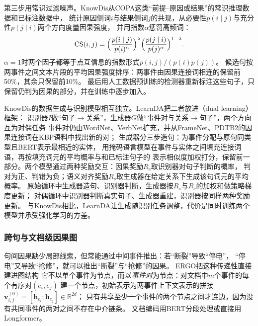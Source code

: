 第三步用常识过滤噪声。KnowDis从COPA这类“前提--原因或结果”的常识推理数据和已标注数据中，
统计原因侧词$i$与结果侧词$j$的共现，从必要性$p(i\mid j)$与充分性$p(j\mid i)$两个方向度量因果强度，
并用指数$\alpha$惩罚高频词：
\begin{equation}
  \mathrm{CS}(i,j)=\Bigl(\frac{p(i\mid j)}{p(i)^{\alpha}}\Bigr)^{\lambda}
                   \Bigl(\frac{p(j\mid i)}{p(j)^{\alpha}}\Bigr)^{1-\lambda}.
  \label{eq:nlp-extraction-knowdis-cs}
\end{equation}
$\alpha=1$时两个因子都等于点互信息的指数形式$p(i,j)/(p(i)p(j))$。
候选句按两事件之间文本片段的平均因果强度排序：两事件由因果连接词相连的保留前50\%，其余只保留前10\%。
最后用人工数据预训练的检测器重新标注这些句子，只保留仍判为因果的部分，并在训练中逐步加入。

KnowDis的数据生成与识别模型相互独立。LearnDA把二者放进（dual learning）框架：
识别器$I$做“句子$\to$关系”，生成器$G$做“事件对与关系$\to$句子”，两个方向互为对偶任务
事件对仍由WordNet、VerbNet扩充，并从FrameNet、PDTB2的因果连接词在KBP语料中找出新的对；
生成器分三步造句：为事件分配与原句同类型且BERT表示最相近的实体，
用掩码语言模型在事件与实体之间填充连接词语，再按填充词元的平均概率与和已标注句子的
表示相似度加权打分，保留前一部分。两个模型通过两种奖励交互：因果奖励$R_c$取识别器对句子判断的概率，
判对为正、判错为负；语义对齐奖励$R_s$取生成器在给定关系下生成该句词元的平均概率。
原始循环中生成器造句、识别器判断，生成器按$R_s$与$R_c$的加权和做策略梯度更新；
对偶循环中识别器判断真实句子、生成器重建，识别器按同样两种奖励更新。
与KnowDis相比，LearnDA让生成随识别任务调整，代价是同时训练两个模型并承受强化学习的方差。

\subsubsection{跨句与文档级因果图}
\label{sec:nlp-extraction-causal-document}

句间因果缺少局部线索，但常能通过中间事件推出：若“断裂”导致“停电”，
“停电”又导致“抢修”，就可以推出“断裂”与“抢修”的因果。
ERGO把这种传递性直接建进图结构
它不以单个事件为节点，而以\emph{事件对}为节点：对文档中$m$个事件的每个有序对$(e_i,e_j)$
建一个节点，初始表示为两事件上下文表示的拼接
$\bm{v}^{(0)}_{i,j}=[\bm{h}_{e_i};\bm{h}_{e_j}]\in\mathbb{R}^{2d}$；
只有共享至少一个事件的两个节点之间才连边，因为没有共同事件的两对之间不存在中介链条。
文档编码用BERT分段处理或直接用Longformer。

